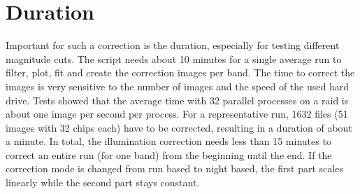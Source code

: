 \chapter{Duration}
\label{sec:IllumCorrectionDuration}
Important for such a correction is the duration, especially for testing different magnitude cuts. The script needs about 10 minutes for a single average run to filter, plot, fit and create the correction images per band. The time to correct the images is very sensitive to the number of images and the speed of the used hard drive. Tests showed that the average time with 32 parallel processes on a raid is about one image per second per process. For a representative run, 1632 files (51 images with 32 chips each) have to be corrected, resulting in a duration of about a minute. In total, the illumination correction needs less than 15 minutes to correct an entire run (for one band) from the beginning until the end. If the correction mode is changed from run based to night based, the first part scales linearly while the second part stays constant.
